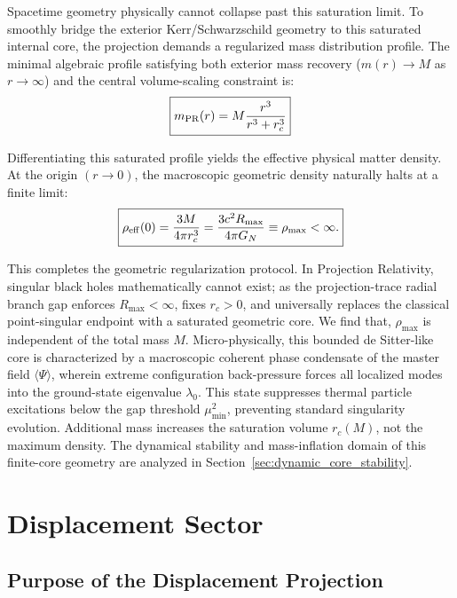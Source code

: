 \documentclass[11pt]{article}
\begin{document}
Spacetime geometry physically cannot collapse past this saturation limit. To smoothly bridge the exterior Kerr/Schwarzschild geometry to this saturated internal core, the projection demands a regularized mass distribution profile. The minimal algebraic profile satisfying \cite{Hayward2006} both exterior mass recovery ($m(r) \to M$ as $r \to \infty$) and the central volume-scaling constraint is:
\begin{equation}
\boxed{ m_{\rm PR}(r) = M \frac{r^3}{r^3 + r_c^3} }
\end{equation}

Differentiating this saturated profile yields the effective physical matter density. At the origin \((r\to0)\), the macroscopic geometric density naturally halts at a finite limit:
\begin{equation}
\boxed{
\rho_{\rm eff}(0)
=
\frac{3M}{4\pi r_c^3}
=
\frac{3c^2R_{\max}}{4\pi G_N}
\equiv
\rho_{\max}
<
\infty .
}
\label{eq:rho_max_core}
\end{equation}

This completes the geometric regularization protocol. In Projection Relativity, singular black holes mathematically cannot exist; as the projection-trace radial branch gap enforces \(R_{\max}<\infty\), fixes \(r_c>0\), and universally replaces the classical point-singular endpoint with a saturated geometric core. We find that, \(\rho_{\max}\) is independent of the total mass \(M\). \noindent Micro-physically, this bounded de Sitter-like core is characterized by a macroscopic coherent phase condensate of the master field $\langle \Psi \rangle$, wherein extreme configuration back-pressure forces all localized modes into the ground-state eigenvalue $\lambda_0$. This state suppresses thermal particle excitations below the gap threshold $\mu_{\min}^2$, preventing standard singularity evolution. Additional mass increases the saturation volume \(r_c(M)\), not the maximum density. The dynamical stability and mass-inflation domain of this finite-core geometry
are analyzed in Section~\ref{sec:dynamic_core_stability}.

\section{Displacement Sector}
\label{sec:displacement_sector}
\label{sec:displacement_higgs_sector}

\subsection{Purpose of the Displacement Projection}
\label{sec:purpose_displacement_projection}
\end{document}
